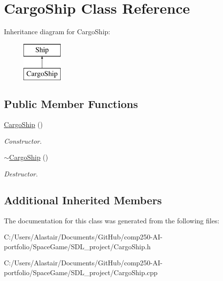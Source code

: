 \hypertarget{class_cargo_ship}{}\section{Cargo\+Ship Class Reference}
\label{class_cargo_ship}
Inheritance diagram for Cargo\+Ship\+:\begin{figure}[H]
\begin{center}
\leavevmode
\includegraphics[height=2.000000cm]{class_cargo_ship}
\end{center}
\end{figure}
\subsection*{Public Member Functions}
\begin{DoxyCompactItemize}
\item 
\mbox{\label{class_cargo_ship_a8cb7bc3c5f733c1d9972c348f65de1d8}} 
\hyperlink{class_cargo_ship_a8cb7bc3c5f733c1d9972c348f65de1d8}{Cargo\+Ship} ()
\begin{DoxyCompactList}\small\item\em Constructor. \end{DoxyCompactList}\item 
\mbox{\label{class_cargo_ship_ab1574d0f229f183091a822b9b2e857c5}} 
\hyperlink{class_cargo_ship_ab1574d0f229f183091a822b9b2e857c5}{$\sim$\+Cargo\+Ship} ()
\begin{DoxyCompactList}\small\item\em Destructor. \end{DoxyCompactList}\end{DoxyCompactItemize}
\subsection*{Additional Inherited Members}


The documentation for this class was generated from the following files\+:\begin{DoxyCompactItemize}
\item 
C\+:/\+Users/\+Alastair/\+Documents/\+Git\+Hub/comp250-\/\+A\+I-\/portfolio/\+Space\+Game/\+S\+D\+L\+\_\+project/Cargo\+Ship.\+h\item 
C\+:/\+Users/\+Alastair/\+Documents/\+Git\+Hub/comp250-\/\+A\+I-\/portfolio/\+Space\+Game/\+S\+D\+L\+\_\+project/Cargo\+Ship.\+cpp\end{DoxyCompactItemize}

